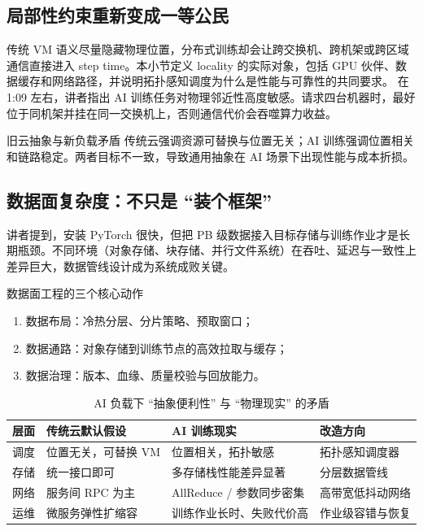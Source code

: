 \documentclass[a4paper]{article}
\begin{document}
\subsection{局部性约束重新变成一等公民}
传统 VM 语义尽量隐藏物理位置，分布式训练却会让跨交换机、跨机架或跨区域通信直接进入 step time。本小节定义 locality 的实际对象，包括 GPU 伙伴、数据缓存和网络路径，并说明拓扑感知调度为什么是性能与可靠性的共同要求。
在 1:09 左右，讲者指出 AI 训练任务对物理邻近性高度敏感。请求四台机器时，最好位于同机架并挂在同一交换机上，否则通信代价会吞噬算力收益。

\begin{importantbox}{旧云抽象与新负载矛盾}
传统云强调资源可替换与位置无关；AI 训练强调位置相关和链路稳定。两者目标不一致，导致通用抽象在 AI 场景下出现性能与成本折损。
\end{importantbox}

\subsection{数据面复杂度：不只是 ``装个框架''}
讲者提到，安装 PyTorch 很快，但把 PB 级数据接入目标存储与训练作业才是长期瓶颈。不同环境（对象存储、块存储、并行文件系统）在吞吐、延迟与一致性上差异巨大，数据管线设计成为系统成败关键。

\begin{knowledgebox}{数据面工程的三个核心动作}
\begin{enumerate}
    \item 数据布局：冷热分层、分片策略、预取窗口；
    \item 数据通路：对象存储到训练节点的高效拉取与缓存；
    \item 数据治理：版本、血缘、质量校验与回放能力。
\end{enumerate}
\end{knowledgebox}

\begin{table}[H]
\centering
\begin{tabular}{p{2.8cm}p{3.8cm}p{3.7cm}p{2.7cm}}
\toprule
\textbf{层面} & \textbf{传统云默认假设} & \textbf{AI 训练现实} & \textbf{改造方向} \\
\midrule
调度 & 位置无关，可替换 VM & 位置相关，拓扑敏感 & 拓扑感知调度器 \\
存储 & 统一接口即可 & 多存储栈性能差异显著 & 分层数据管线 \\
网络 & 服务间 RPC 为主 & AllReduce / 参数同步密集 & 高带宽低抖动网络 \\
运维 & 微服务弹性扩缩容 & 训练作业长时、失败代价高 & 作业级容错与恢复 \\
\bottomrule
\end{tabular}
\caption{AI 负载下 ``抽象便利性'' 与 ``物理现实'' 的矛盾}
\end{table}
\end{document}

